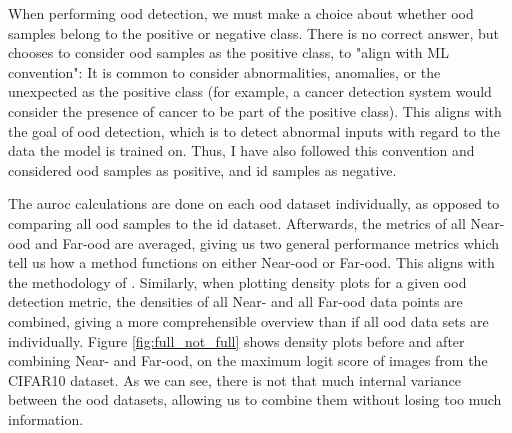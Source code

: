 \documentclass[UKenglish]{uiomasterthesis} %
\theoremstyle{definition}
\begin{document}

When performing \ac{ood} detection, we must make a choice about whether \ac{ood} samples belong to the positive or negative class. There is no correct answer, but \cite{openood} chooses to consider \ac{ood} samples as the positive class, to "align with ML convention": It is common to consider abnormalities, anomalies, or the unexpected as the positive class (for example, a cancer detection system would consider the presence of cancer to be part of the positive class). This aligns with the goal of \ac{ood} detection, which is to detect abnormal inputs with regard to the data the model is trained on. Thus, I have also followed this convention and considered \ac{ood} samples as positive, and \ac{id} samples as negative.

The \ac{auroc} calculations are done on each \ac{ood} dataset individually, as opposed to comparing all \ac{ood} samples to the \ac{id} dataset. Afterwards, the metrics of all Near-\ac{ood} and Far-\ac{ood} are averaged, giving us two general performance metrics which tell us how a method functions on either Near-\ac{ood} or Far-\ac{ood}. This aligns with the methodology of \cite{openood}. Similarly, when plotting density plots for a given \ac{ood} detection metric, the densities of all Near- and all Far-\ac{ood} data points are combined, giving a more comprehensible overview than if all \ac{ood} data sets are individually. Figure \ref{fig:full_not_full} shows density plots before and after combining Near- and Far-\ac{ood}, on the maximum logit score of images from the CIFAR10 dataset. As we can see, there is not that much internal variance between the \ac{ood} datasets, allowing us to combine them without losing too much information.
\end{document}

